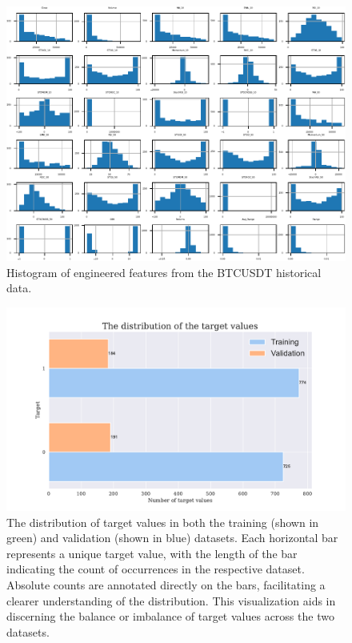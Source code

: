 \begin{figure}[h]
\centering
\includegraphics[page=1, trim=0 0 0 0, width=\textwidth, clip]{./uml/dataset_histogram.pdf}
\caption{Histogram of engineered features from the BTCUSDT historical data.}
\label{fig:dataset_histogram}
\end{figure}


\begin{figure}[h]
\centering
\includegraphics[width=\linewidth]{./uml/signal_distribution.pdf}
    \caption{The distribution of target values in both the training (shown in green) and validation (shown in blue) datasets. Each horizontal bar represents a unique target value, with the length of the bar indicating the count of occurrences in the respective dataset. Absolute counts are annotated directly on the bars, facilitating a clearer understanding of the distribution. This visualization aids in discerning the balance or imbalance of target values across the two datasets.}
\label{fig:signal_distribution}
\end{figure}



